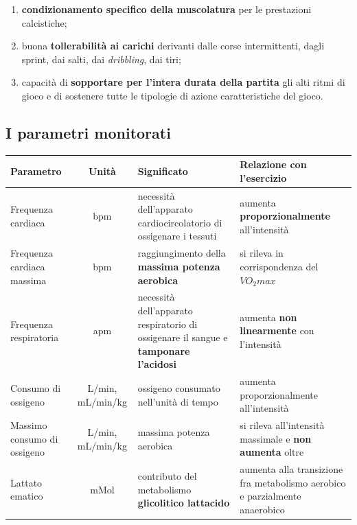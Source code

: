 \begin{enumerate}
  \item \textbf{condizionamento specifico della muscolatura} per le prestazioni calcistiche;
  \item buona \textbf{tollerabilità ai carichi} derivanti dalle corse intermittenti, dagli sprint,
    dai salti, dai \textit{dribbling}, dai tiri;
  \item capacità di \textbf{sopportare per l'intera durata della partita} gli alti ritmi di gioco e
    di sostenere tutte le tipologie di azione caratteristiche del gioco.
\end{enumerate}

\subsection{I parametri monitorati}

\begin{table}[htbp]
  \centering
  \small
  \renewcommand{\arraystretch}{1.3}
  \begin{tabularx}{\textwidth}{|l|c|X|X|}
    \hline
    \textbf{Parametro} & \textbf{Unità} & \textbf{Significato} & \textbf{Relazione con l'esercizio}
      \\
    \hline
    Frequenza cardiaca & bpm & necessità dell'apparato cardiocircolatorio di ossigenare i tessuti &
      aumenta \textbf{proporzionalmente} all'intensità \\
    \hline
    Frequenza cardiaca massima & bpm & raggiungimento della \textbf{massima potenza aerobica} &
      si rileva in corrispondenza del $VO_2max$ \\
    \hline
    Frequenza respiratoria & apm & necessità dell'apparato respiratorio di ossigenare il sangue e
      \textbf{tamponare l'acidosi} & aumenta \textbf{non linearmente} con l'intensità \\
    \hline
    Consumo di ossigeno & L/min, mL/min/kg & ossigeno consumato nell'unità di tempo & aumenta
      proporzionalmente all'intensità \\
    \hline
    Massimo consumo di ossigeno & L/min, mL/min/kg & massima potenza aerobica & si rileva
      all'intensità massimale e \textbf{non aumenta} oltre \\
    \hline
    Lattato ematico & mMol & contributo del metabolismo \textbf{glicolitico lattacido} & aumenta
      alla transizione fra metabolismo aerobico e parzialmente anaerobico \\
    \hline
  \end{tabularx}
\end{table}

